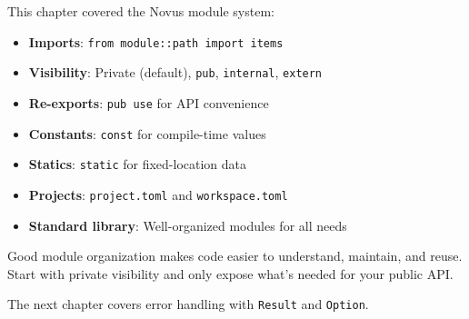This chapter covered the Novus module system:

\begin{itemize}
    \item \textbf{Imports}: \texttt{from module::path import items}
    \item \textbf{Visibility}: Private (default), \texttt{pub}, \texttt{internal}, \texttt{extern}
    \item \textbf{Re-exports}: \texttt{pub use} for API convenience
    \item \textbf{Constants}: \texttt{const} for compile-time values
    \item \textbf{Statics}: \texttt{static} for fixed-location data
    \item \textbf{Projects}: \texttt{project.toml} and \texttt{workspace.toml}
    \item \textbf{Standard library}: Well-organized modules for all needs
\end{itemize}

Good module organization makes code easier to understand, maintain, and reuse. Start with private visibility and only expose what's needed for your public API.

The next chapter covers error handling with \texttt{Result} and \texttt{Option}.
